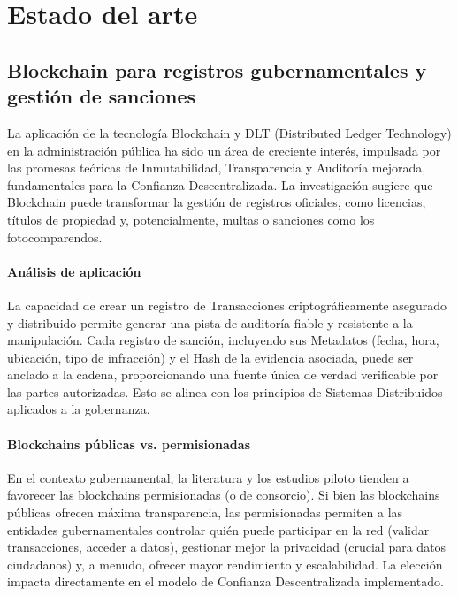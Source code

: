 \section{\large Estado del arte}  

\subsection{Blockchain para registros gubernamentales y gestión de sanciones} 

La aplicación de la tecnología Blockchain y DLT (Distributed Ledger Technology) en la administración pública ha sido un área de creciente interés, impulsada por las promesas teóricas de Inmutabilidad, Transparencia y Auditoría mejorada, fundamentales para la Confianza Descentralizada. La investigación sugiere que Blockchain puede transformar la gestión de registros oficiales, como licencias, títulos de propiedad y, potencialmente, multas o sanciones como los fotocomparendos. 

\paragraph{Análisis de aplicación}
La capacidad de crear un registro de Transacciones criptográficamente asegurado y distribuido permite generar una pista de auditoría fiable y resistente a la manipulación. Cada registro de sanción, incluyendo sus Metadatos (fecha, hora, ubicación, tipo de infracción) y el Hash de la evidencia asociada, puede ser anclado a la cadena, proporcionando una fuente única de verdad verificable por las partes autorizadas. Esto se alinea con los principios de Sistemas Distribuidos aplicados a la gobernanza. 

\paragraph{Blockchains públicas vs. permisionadas}
En el contexto gubernamental, la literatura y los estudios piloto tienden a favorecer las blockchains permisionadas (o de consorcio). Si bien las blockchains públicas ofrecen máxima transparencia, las permisionadas permiten a las entidades gubernamentales controlar quién puede participar en la red (validar transacciones, acceder a datos), gestionar mejor la privacidad (crucial para datos ciudadanos) y, a menudo, ofrecer mayor rendimiento y escalabilidad. La elección impacta directamente en el modelo de Confianza Descentralizada implementado. 

